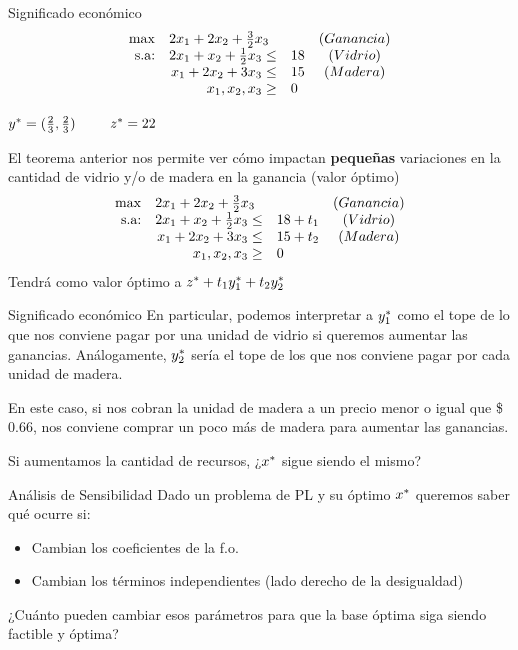 \documentclass[10pt, aspectratio=169]{beamer}
\begin{document}
\begin{frame}{Significado económico}
        $$
    \begin{array}{rrlc}
    \max & \multicolumn{2}{l}{2x_1+2x_2+\frac{3}{2}x_3} & (Ganancia)\\
    \text{s.a:}& 2x_1+x_2+\frac{1}{2}x_3\leq & 18 & (Vidrio)\\
     & x_1+2x_2+3x_3\leq & 15 & (Madera)\\
     & x_1, x_2, x_3\geq & 0 \\
    \end{array}
    $$
    \begin{center}
         $y^{\ast}=(\frac{2}{3}, \frac{2}{3})\qquad$  $z^{\ast}=22$
    \end{center}
    El teorema anterior nos permite ver cómo impactan \textbf{pequeñas} variaciones en la cantidad de vidrio y/o de madera en la ganancia (valor óptimo)
    $$
    \begin{array}{rrlc}
    \max & \multicolumn{2}{l}{2x_1+2x_2+\frac{3}{2}x_3} & (Ganancia)\\
    \text{s.a:}& 2x_1+x_2+\frac{1}{2}x_3\leq & 18+t_1 & (Vidrio)\\
     & x_1+2x_2+3x_3\leq & 15+t_2 & (Madera)\\
     & x_1, x_2, x_3\geq & 0 \\
    \end{array}
    $$
    Tendrá como valor óptimo a $z^{\ast} + t_1y^{\ast}_1 + t_2y^{\ast}_2$
\end{frame}

\begin{frame}{Significado económico}
    En particular, podemos interpretar a $y^{\ast}_1$ como el tope de lo que nos conviene pagar por una unidad de vidrio si queremos aumentar las ganancias. Análogamente, $y^{\ast}_2$ sería el tope de los que nos conviene pagar por cada unidad de madera.

    En este caso, si nos cobran la unidad de madera a un precio menor o igual que \$$0.66$, nos conviene comprar un poco más de madera para aumentar las ganancias. \vspace{1cm}
    \pause
    \begin{center}
        \alert{Si aumentamos la cantidad de recursos, ¿$x^{\ast}$ sigue siendo el mismo?} 
    \end{center}
\end{frame}

\begin{frame}{Análisis de Sensibilidad}
    Dado un problema de PL y su óptimo $x^{\ast}$ queremos saber qué ocurre si:
    \begin{itemize}
        \item Cambian los coeficientes de la f.o.
        \item Cambian los términos independientes (lado derecho de la desigualdad)
    \end{itemize}
    \vskip 1cm
    \centering
    ¿Cuánto pueden cambiar esos parámetros para que la base óptima siga siendo factible y óptima?
\end{frame}
\end{document}
